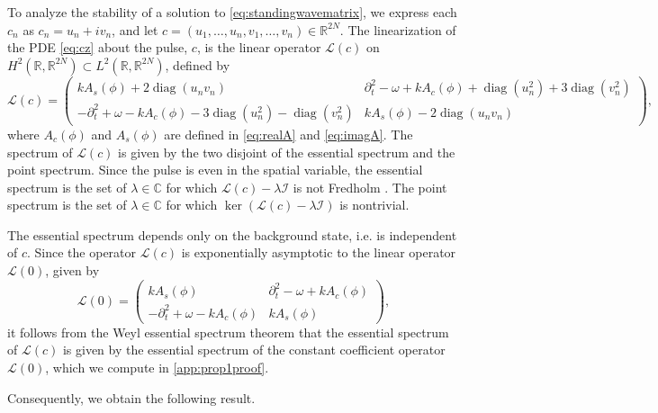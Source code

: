 \documentclass[11pt,reqno]{amsart}
\def\R{{\mathbb R}}
\def\C{{\mathbb C}}
\def\calI{{\mathcal I}}
\def\calL{{\mathcal L}}
\DeclareMathOperator{\diag}{diag}
\begin{document}
To analyze the stability of a solution to \cref{eq:standingwavematrix}, we express each $c_n$ as $c_n = u_n + i v_n$, and let $c = (u_1, \dots, u_n,v_1, \dots, v_n) \in \R^{2N}$. The linearization of the PDE \cref{eq:cz} about the pulse, $c$, is the linear operator $\calL(c)$ on $H^2(\R, \R^{2N}) \subset L^2(\R, \R^{2N})$, defined by 
\begin{equation}\label{eq:linc}
\calL(c) = \begin{pmatrix}
k A_s(\phi) + 2 \diag(u_n v_n) & \partial_t^2 - \omega + k A_c(\phi) + \diag(u_n^2) + 3 \diag(v_n^2) \\
-\partial_t^2 + \omega - k A_c(\phi) - 3\diag(u_n^2) - \diag(v_n^2) &
k A_s(\phi) - 2 \diag(u_n v_n)
\end{pmatrix},
\end{equation}
where $A_c(\phi)$ and $A_s(\phi)$ are defined in \eqref{eq:realA} and \eqref{eq:imagA}. The spectrum of $\calL(c) $ is given by the  two disjoint
of the essential spectrum and the point spectrum. Since the 
pulse is even in the spatial variable, the
 essential spectrum is the set of $\lambda \in \C$ for which $\calL(c) - \lambda \calI$ is not Fredholm \cite[Section 3.1]{Kapitula2013}. The point spectrum is the set of $\lambda \in \C$ for which $\ker( \calL(c) - \lambda \calI)$ is nontrivial. 

 The essential spectrum depends only on the background state, i.e. is independent of $c$. Since the operator $\calL(c)$ is exponentially asymptotic to the linear operator $\calL(0)$, given by
\begin{equation}\label{eq:L0}
\calL(0) = \begin{pmatrix}
k A_s(\phi) & \partial_t^2 - \omega + k A_c(\phi)  \\
-\partial_t^2 + \omega - k A_c(\phi) &
k A_s(\phi) 
\end{pmatrix},
\end{equation}
it follows from the Weyl essential spectrum theorem \cite[Theorem 2.2.6]{Kapitula2013} that the essential spectrum of $\calL(c)$ is given by the essential spectrum of the constant coefficient operator $\calL(0)$, which we compute in \cref{app:prop1proof}. 

Consequently, we obtain the following result.
\end{document}
